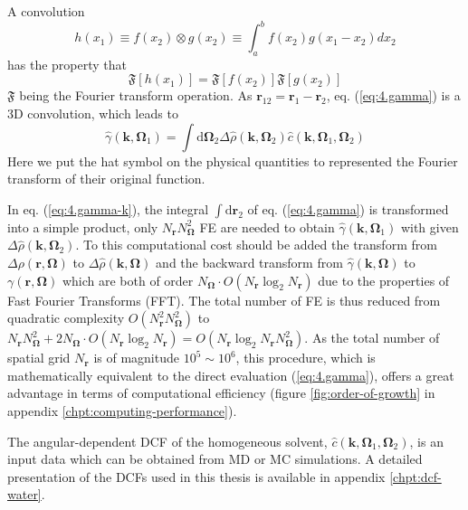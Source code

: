 A convolution
\begin{equation}
h(x_{1})\equiv f(x_{2})\otimes g(x_{2})\equiv\int_{a}^{b}f(x_{2})g(x_{1}-x_{2})dx_{2}\label{eq:convolution-1}
\end{equation}
has the property that
\begin{equation}
\mathfrak{F}[h(x_{1})]=\mathfrak{F}[f(x_{2})]\mathfrak{F}[g(x_{2})]\label{eq:convolution-2}
\end{equation}
$\mathfrak{F}$ being the Fourier transform operation. As $\mathbf{r}_{12}=\mathbf{r}_{1}-\mathbf{r}_{2}$,
eq. (\ref{eq:4.gamma}) is a 3D convolution, which leads to
\begin{equation}
\hat{\gamma}(\mathbf{k},\mathbf{\Omega}_{1})=\int\mathrm{d}\mathbf{\Omega}_{2}\Delta\hat{\rho}(\mathbf{k},\mathbf{\Omega}_{2})\hat{c}(\mathbf{k},\mathbf{\Omega}_{1},\mathbf{\Omega}_{2})\label{eq:4.gamma-k}
\end{equation}
Here we put the hat symbol on the physical quantities to represented
the Fourier transform of their original function.

In eq. (\ref{eq:4.gamma-k}), the integral $\int\mathrm{d}\mathbf{r}_{2}$
of eq. (\ref{eq:4.gamma}) is transformed into a simple product, only
$N_{\mathbf{r}}N_{\mathbf{\Omega}}^{2}$ \acs{FE} are needed to obtain
$\hat{\gamma}(\mathbf{k},\mathbf{\Omega}_{1})$ with given $\Delta\hat{\rho}(\mathbf{k},\mathbf{\Omega}_{2})$.
To this computational cost should be added the transform from $\Delta\rho(\mathbf{r},\mathbf{\Omega})$
to $\Delta\hat{\rho}(\mathbf{k},\mathbf{\Omega})$ and the backward
transform from $\hat{\gamma}(\mathbf{k},\mathbf{\Omega})$ to $\gamma(\mathbf{r},\mathbf{\Omega})$
which are both of order $N_{\mathbf{\Omega}}\cdot O(N_{\mathbf{r}}\log_{2}N_{\mathbf{r}})$
due to the properties of Fast Fourier Transforms (\acs{FFT}). The
total number of \acs{FE} is thus reduced from quadratic complexity
$O(N_{\mathbf{r}}^{2}N_{\mathbf{\Omega}}^{2})$ to $N_{\mathbf{r}}N_{\mathbf{\Omega}}^{2}+2N_{\mathbf{\Omega}}\cdot O(N_{\mathbf{r}}\log_{2}N_{\mathbf{r}})=O(N_{\mathbf{r}}\log_{2}N_{\mathbf{r}}N_{\mathbf{\Omega}}^{2})$.
As the total number of spatial grid $N_{\mathbf{r}}$ is of magnitude
$10^{5}\sim10^{6}$, this procedure, which is mathematically equivalent
to the direct evaluation (\ref{eq:4.gamma}), offers a great advantage
in terms of computational efficiency (figure \ref{fig:order-of-growth}
in appendix \ref{chpt:computing-performance}).

The angular-dependent \acs{DCF} of the homogeneous solvent, $\hat{c}(\mathbf{k},\mathbf{\Omega}_{1},\mathbf{\Omega}_{2})$,
is an input data which can be obtained from \acs{MD} or \acs{MC}
simulations. A detailed presentation of the \acs{DCF}s used in this
thesis is available in appendix \ref{chpt:dcf-water}.

